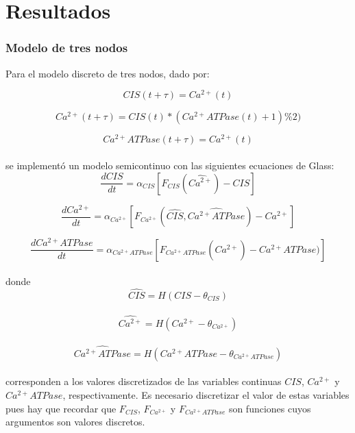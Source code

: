 \chapter{Resultados}\label{ch:resultados}

\subsection{Modelo de tres nodos}

Para el modelo discreto de tres nodos, dado por:

\begin{equation}
CIS(t+\tau) = Ca^{2+}(t)
\end{equation}

\begin{equation}
Ca^{2+}(t+\tau) = CIS(t) * (Ca^{2+}ATPase(t) + 1) \% 2)
\end{equation}

\begin{equation}
Ca^{2+}ATPase(t+\tau) = Ca^{2+}(t)
\end{equation} 
\\
se implementó un modelo semicontinuo con las siguientes ecuaciones de Glass:
\begin{equation}
\frac{dCIS}{dt} = \alpha_{CIS} [F_{CIS}(\widehat{Ca^{2+}}) - CIS]
\end{equation}

\begin{equation}
\frac{dCa^{2+}}{dt} = \alpha_{Ca^{2+}} [F_{Ca^{2+}}(\widehat{CIS}, \widehat{Ca^{2+}ATPase}) - Ca^{2+}]
\end{equation}

\begin{equation}
\frac{dCa^{2+}ATPase}{dt} = \alpha_{Ca^{2+}ATPase} [F_{Ca^{2+}ATPase}(\widehat{Ca^{2+}}) - Ca^{2+}ATPase)]
\end{equation} 
\\
donde
$$\widehat{CIS} = H(CIS - \theta_{CIS})$$
\\
$$\widehat{Ca^{2+}} = H(Ca^{2+} - \theta_{Ca^{2+}})$$
\\
$$\widehat{Ca^{2+}ATPase} = H(Ca^{2+}ATPase - \theta_{Ca^{2+}ATPase})$$
\\
corresponden a los valores discretizados de las variables continuas $CIS$, $Ca^{2+}$ y $Ca^{2+}ATPase$, respectivamente. Es necesario discretizar el valor de estas variables pues hay que recordar que $F_{CIS}$, $F_{Ca^{2+}}$ y $F_{Ca^{2+}ATPase}$ son funciones cuyos argumentos son valores discretos.


